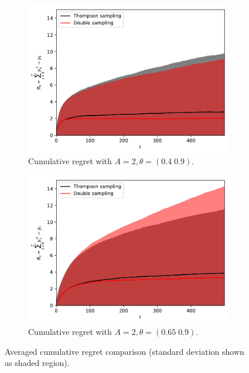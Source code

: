\documentclass[10pt]{article}
\begin{document}
\begin{figure}[!h]
	\centering
	\begin{subfigure}[b]{0.5\textwidth}
		\includegraphics[width=\textwidth]{./figs/bernoulli/cumulative_regret_great.pdf}
		\caption{Cumulative regret with $A=2, \theta=\left(0.4 \; 0.9\right)$.}
		\label{fig:bernoulli_cumulative_regret_great}
	\end{subfigure}%
	\begin{subfigure}[b]{0.5\textwidth}
		\includegraphics[width=\textwidth]{./figs/bernoulli/cumulative_regret_notgreat.pdf}
		\caption{Cumulative regret with $A=2, \theta=\left(0.65 \; 0.9\right)$.}
		\label{fig:bernoulli_cumulative_regret_notgreat}
	\end{subfigure}
	\caption{Averaged cumulative regret comparison (standard deviation shown as shaded region).}
	\label{fig:bernoulli_cumulative_regret_compare}
\end{figure}
\end{document}
